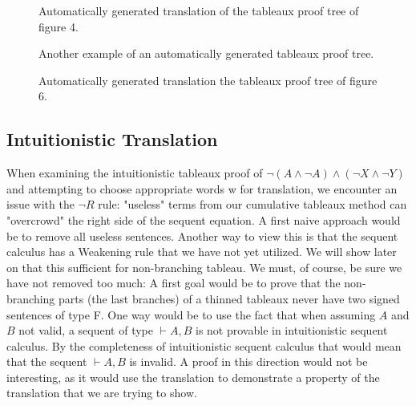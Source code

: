 \documentclass[runningheads]{llncs}
\begin{document}
\begin{figure}

    {\fontsize{1}{1}\selectfont
\ocmalImageI

\caption{Automatically generated translation of the tableaux proof tree of figure 4.}
\label{fig:destructive_tableaux}
    }
\end{figure}



\begin{figure}

    {\fontsize{1}{1}\selectfont
\ocmalImageIII

\caption{Another example of an automatically generated tableaux proof tree.}
\label{fig:destructive_tableaux}
    }
\end{figure}


\begin{figure}

    {\fontsize{1}{1}\selectfont
\ocmalImageIIII

\caption{Automatically generated translation the tableaux proof tree of figure 6.}
\label{fig:destructive_tableaux}
    }
\end{figure}


\newpage
\subsection{Intuitionistic Translation}


When examining the intuitionistic tableaux proof of  $\neg (A \land \neg A) \land (\neg X \land \neg Y)$ and attempting to choose 
appropriate words w for translation, we encounter an issue with the $\neg R$ rule: 
"useless" terms from our cumulative tableaux method can "overcrowd" the right side of the sequent equation. 
A first naive approach would be to remove all useless sentences. 
Another way to view this is that the sequent calculus has a Weakening rule that we have not yet utilized.
We will show later on that this sufficient for non-branching tableau.
\ThinningFunctionDefinition
We must, of course, be sure we have not removed too much:
\thinnedInvalidityproof
\thinnedsizeproof
A first goal would be to prove that the non-branching parts (the last branches) of a thinned tableaux never have two signed sentences of type F.
One way would be to use the fact that when assuming $A$ and $B$ not valid, a sequent of type $ \vdash A, B$ is not provable in intuitionistic sequent calculus. 
By the completeness of intuitionistic sequent calculus that would mean that the sequent $ \vdash A, B$ is invalid. A proof in this direction would not be
 interesting, as it would use the translation to demonstrate a property of the translation that we are trying to show. 
\end{document}
